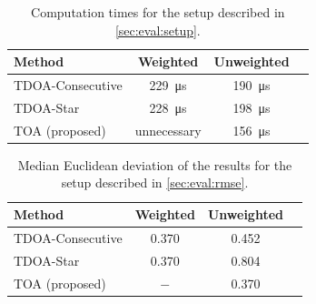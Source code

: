 \documentclass[conference]{IEEEtran}
\begin{document}
\begin{table}[t]
\centering
\begin{tabular}{l|c|c|r} 
Method           & Weighted                  & Unweighted  \\ \hline
TDOA-Consecutive & \SI{229}{\micro\second}   & \SI{190}{\micro\second}    \\
TDOA-Star        & \SI{228}{\micro\second}   & \SI{198}{\micro\second}    \\ 
TOA (proposed)   & unnecessary               & \SI{156}{\micro\second}    
\end{tabular}
\caption{Computation times for the setup described in \cref{sec:eval:setup}. }
\label{table:times}
\end{table}


\begin{table}[t]
\centering
\begin{tabular}{l|c|c|r} 
Method           & Weighted  & Unweighted  \\ \hline
TDOA-Consecutive & 0.370     & 0.452    \\
TDOA-Star        & 0.370     & 0.804    \\ 
TOA (proposed)   & $-$      & 0.370
\end{tabular}
\caption{Median Euclidean deviation of the results for the setup described in \cref{sec:eval:rmse}.}
\label{table:RMSE}
\end{table}


%
%
\end{document}
